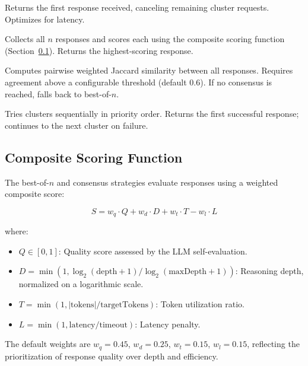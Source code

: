 \documentclass[journal,10pt]{IEEEtran}
\begin{document}
\begin{description}[nosep,style=unboxed,leftmargin=0pt,font=\normalfont\itshape]
\item[First-wins.] Returns the first response received, canceling remaining cluster requests. Optimizes for latency.

\item[Best-of-$n$.] Collects all $n$ responses and scores each using the composite scoring function (Section~\ref{sec:scoring}). Returns the highest-scoring response.

\item[Consensus.] Computes pairwise weighted Jaccard similarity between all responses. Requires agreement above a configurable threshold (default 0.6). If no consensus is reached, falls back to best-of-$n$.

\item[Fallback-chain.] Tries clusters sequentially in priority order. Returns the first successful response; continues to the next cluster on failure.
\end{description}

\subsection{Composite Scoring Function}
\label{sec:scoring}

The best-of-$n$ and consensus strategies evaluate responses using a weighted composite score:

\begin{equation}
S = w_q \cdot Q + w_d \cdot D + w_t \cdot T - w_l \cdot L
\label{eq:score}
\end{equation}

\noindent where:
\begin{itemize}[nosep]
\item $Q \in [0,1]$: Quality score assessed by the LLM self-evaluation.
\item $D = \min(1, \log_2(\text{depth} + 1) / \log_2(\text{maxDepth} + 1))$: Reasoning depth, normalized on a logarithmic scale.
\item $T = \min(1, |\text{tokens}| / \text{targetTokens})$: Token utilization ratio.
\item $L = \min(1, \text{latency} / \text{timeout})$: Latency penalty.
\end{itemize}

The default weights are $w_q = 0.45$, $w_d = 0.25$, $w_t = 0.15$, $w_l = 0.15$, reflecting the prioritization of response quality over depth and efficiency.
\end{document}
